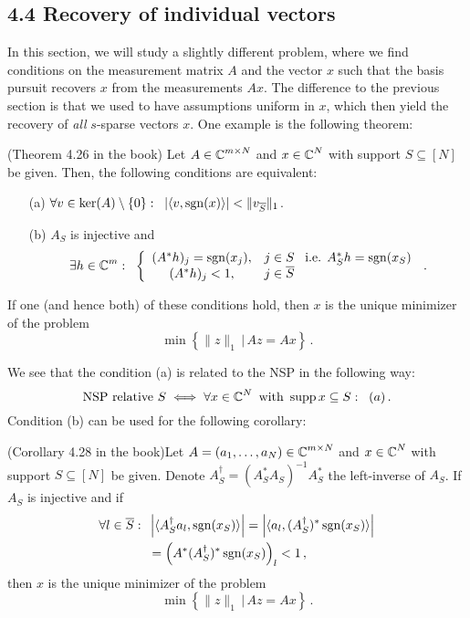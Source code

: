 \documentclass[a4paper]{article}
\begin{document}
\subsection*{4.4  Recovery of individual vectors}

In this section, we will study a slightly different problem, where we find conditions on the measurement matrix \(A \) and the vector \(x\) such that the basis pursuit recovers \(x\) from the measurements \(Ax\). The difference to the previous section is that we used to have assumptions uniform in \(x\), which then yield the recovery of \emph{all} \(s\)-sparse vectors \(x\). One example is the following theorem: \begin{Satz*}
		{(Theorem 4.26 in the book)}{} Let \(A\in\operatorname{\mathbb C}^{m\times N}\) and \(x\in\operatorname{\mathbb C}^N\) with support \(S\subseteq[N]\) be given. Then, the following conditions are equivalent:
		\begin{itemize}
			\item[(a)] \(\forall v\in \ker(A)\setminus\{0\}:\;\;|\langle v,\operatorname{\mathrm{sgn}}(x)\rangle|< \|v_{\overline S}\|_1\).
			\item[(b)] \(A_S\) is injective and 
			\[\exists h\in \operatorname{\mathbb C}^m:\;\;\left\{\begin{array}{cl}
				(A^*h)_j=\operatorname{\mathrm{sgn}}(x_j),&j\in S\;\;\;\text{i.e. }A^*_Sh=\operatorname{\mathrm{sgn}}(x_S)\\
				(A^*h)_j<1,&j\in \overline S
			\end{array}\right.\,.\]
			\end{itemize}
			If one (and hence both) of these conditions hold, then \(x\) is the unique minimizer of the problem
			\[\min\left\{\|z\|_1\,\big|\,Az=Ax\right\}\,.\]
	\end{Satz*}

    We see that the condition (a) is related to the NSP in the following way: 
    \[\text{NSP relative }S\iff \forall x\in \operatorname{\mathbb C}^N\text{ with }\operatorname{\textrm{supp}} x\subseteq S:\;\;(a)\,.\]
    Condition (b) can be used for the following corollary:

    \begin{Kor*}
			{(Corollary 4.28 in the book)}{}Let \(A=(a_1,\ldots,a_N)\in\operatorname{\mathbb C}^{m\times N}\) and \(x\in\operatorname{\mathbb C}^N\) with support \(S\subseteq[N]\) be given. Denote \(A_S^{\dagger}=(A^*_SA_S)^{-1}A^*_S\) the left-inverse of \(A_S\). If \(A_S\) is injective and if 
			\begin{align*}
			\forall l\in \overline S:\;\;&\left|\langle A_S^{\dagger}a_l,\operatorname{\mathrm{sgn}}(x_S)\rangle\right|=\left|\langle a_l,(A_S^{\dagger})^*\operatorname{\mathrm{sgn}}(x_S)\rangle\right|\\
			&=\left(A^*(A_S^{\dagger})^*\operatorname{\mathrm{sgn}}(x_S)\right)_l<1\,,
			\end{align*}
			then \(x\) is the unique minimizer of the problem
			\[\min\left\{\|z\|_1\,\big|\,Az=Ax\right\}\,.\]
		\end{Kor*}
\end{document}
